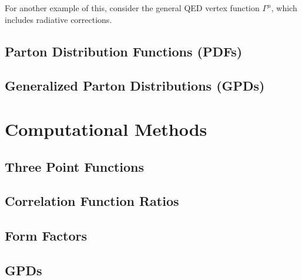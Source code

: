 \documentclass[11pt, oneside]{article}   	%
\theoremstyle{definition}
\begin{document}
For another example of this, consider the general QED vertex function $\Gamma^\mu$, which includes radiative corrections. 

\subsection{Parton Distribution Functions (PDFs)}

\subsection{Generalized Parton Distributions (GPDs)}

\section{Computational Methods}

\subsection{Three Point Functions}

\subsection{Correlation Function Ratios}

\subsection{Form Factors}

\subsection{GPDs}
\end{document}
